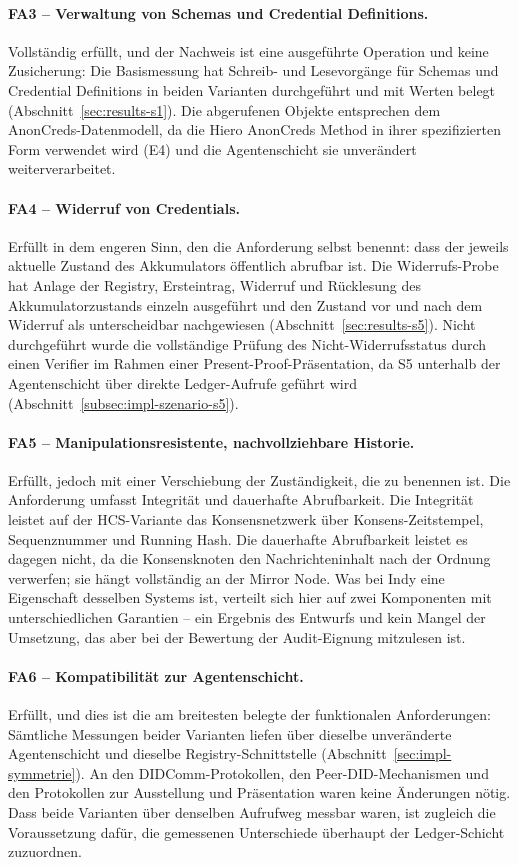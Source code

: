 \paragraph{FA3 -- Verwaltung von Schemas und Credential Definitions.} Vollständig erfüllt, und der Nachweis ist eine ausgeführte Operation und keine Zusicherung: Die Basismessung hat Schreib- und Lesevorgänge für Schemas und Credential Definitions in beiden Varianten durchgeführt und mit Werten belegt (Abschnitt~\ref{sec:results-s1}). Die abgerufenen Objekte entsprechen dem AnonCreds-Datenmodell, da die Hiero AnonCreds Method in ihrer spezifizierten Form verwendet wird (E4) und die Agentenschicht sie unverändert weiterverarbeitet.

\paragraph{FA4 -- Widerruf von Credentials.} Erfüllt in dem engeren Sinn, den die Anforderung selbst benennt: dass der jeweils aktuelle Zustand des Akkumulators öffentlich abrufbar ist. Die Widerrufs-Probe hat Anlage der Registry, Ersteintrag, Widerruf und Rücklesung des Akkumulatorzustands einzeln ausgeführt und den Zustand vor und nach dem Widerruf als unterscheidbar nachgewiesen (Abschnitt~\ref{sec:results-s5}). Nicht durchgeführt wurde die vollständige Prüfung des Nicht-Widerrufsstatus durch einen Verifier im Rahmen einer Present-Proof-Präsentation, da S5 unterhalb der Agentenschicht über direkte Ledger-Aufrufe geführt wird (Abschnitt~\ref{subsec:impl-szenario-s5}).

\paragraph{FA5 -- Manipulationsresistente, nachvollziehbare Historie.} Erfüllt, jedoch mit einer Verschiebung der Zuständigkeit, die zu benennen ist. Die Anforderung umfasst Integrität und dauerhafte Abrufbarkeit. Die Integrität leistet auf der HCS-Variante das Konsensnetzwerk über Konsens-Zeitstempel, Sequenznummer und Running Hash. Die dauerhafte Abrufbarkeit leistet es dagegen nicht, da die Konsensknoten den Nachrichteninhalt nach der Ordnung verwerfen; sie hängt vollständig an der Mirror Node. Was bei Indy eine Eigenschaft desselben Systems ist, verteilt sich hier auf zwei Komponenten mit unterschiedlichen Garantien -- ein Ergebnis des Entwurfs und kein Mangel der Umsetzung, das aber bei der Bewertung der Audit-Eignung mitzulesen ist.

\paragraph{FA6 -- Kompatibilität zur Agentenschicht.} Erfüllt, und dies ist die am breitesten belegte der funktionalen Anforderungen: Sämtliche Messungen beider Varianten liefen über dieselbe unveränderte Agentenschicht und dieselbe Registry-Schnittstelle (Abschnitt~\ref{sec:impl-symmetrie}). An den DIDComm-Protokollen, den Peer-DID-Mechanismen und den Protokollen zur Ausstellung und Präsentation waren keine Änderungen nötig. Dass beide Varianten über denselben Aufrufweg messbar waren, ist zugleich die Voraussetzung dafür, die gemessenen Unterschiede überhaupt der Ledger-Schicht zuzuordnen.



